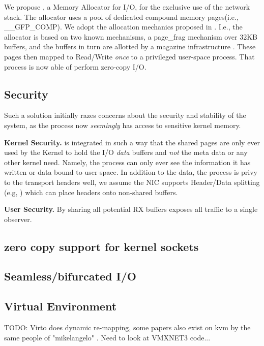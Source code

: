 We propose \oursys, a Memory Allocator for I/O, for the  exclusive use of the network stack. The \oursys allocator uses a pool of dedicated compound memory pages(i.e., \_\_GFP\_COMP). We adopt the allocation mechanics proposed in \cite{markuze2018damn}. I.e., the allocator is based on two known mechanisms, a page\_frag mechanism \cite{pagefrag} over 32KB buffers, and the buffers in turn are allotted by a magazine infrastructure \cite{bonwick2001magazines}. These pages then mapped to Read/Write \emph{once} to a privileged user-space process. That process is now able of perform zero-copy I/O.

\subsection{Security}
Such a solution initially razes concerns about the security and stability of the system, as the process now \emph{seemingly} has access to sensitive kernel memory. 

\noindent\textbf{Kernel Security.} \oursys is integrated in such a way that the shared pages are only ever used by the Kernel to hold the I/O \emph{data} buffers and \emph{not} the meta data or any other kernel need. Namely, the process can only ever see the information it has written or data bound to user-space. In addition to the data, the process is privy to the transport headers well, we assume the NIC supports Header/Data splitting (e.g, \cite{hds}) which can place headers onto non-shared buffers.  

\noindent\textbf{User Security.} By sharing all potential RX buffers \oursys exposes all traffic to a single observer.

\subsection{zero copy support for kernel sockets}
\subsection{Seamless/bifurcated I/O}
\subsection{Virtual Environment}
TODO: Virto does dynamic re-mapping, some papers also exist on kvm by the same people of "mikelangelo" \cite{mikelangelo}. Need to look at VMXNET3 code...